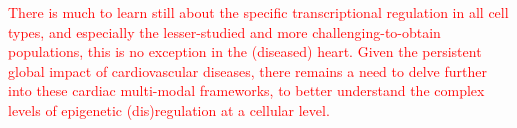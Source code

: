 \textcolor{red}{There is much to learn still about the specific transcriptional regulation in all cell types, and especially the lesser-studied and more challenging-to-obtain populations, this is no exception in the (diseased) heart. Given the persistent global impact of cardiovascular diseases\cite{Tsao2023}, there remains a need to delve further into these cardiac multi-modal frameworks, to better understand the complex levels of epigenetic (dis)regulation at a cellular level.}


